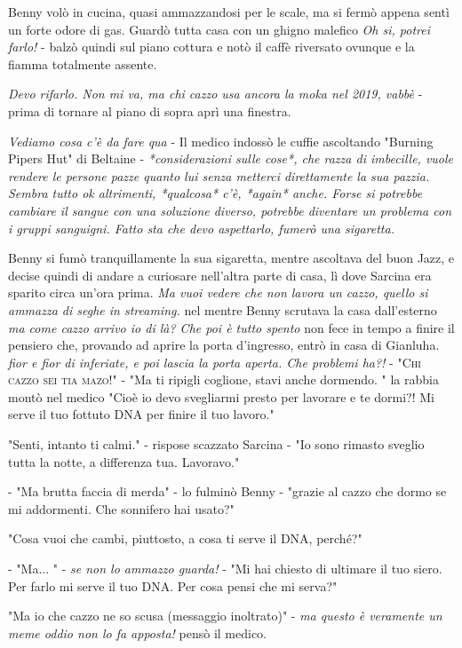 Benny volò in cucina, quasi ammazzandosi per le scale, ma si fermò appena sentì un forte odore di gas. Guardò tutta casa con un ghigno malefico \textit{Oh si, potrei farlo!} - balzò quindi sul piano cottura e notò il caffè riversato ovunque e la fiamma totalmente assente.

\textit{Devo rifarlo. Non mi va, ma chi cazzo usa ancora la moka nel 2019, vabbè} - prima di tornare al piano di sopra aprì una finestra.

\textit{Vediamo cosa c'è da fare qua} - Il medico indossò le cuffie ascoltando "Burning Pipers Hut" di Beltaine - \textit{*considerazioni sulle cose*, che razza di imbecille, vuole rendere le persone pazze quanto lui senza metterci direttamente la sua pazzia. Sembra tutto ok altrimenti, *qualcosa* c'è, *again* anche. Forse si potrebbe cambiare il sangue con una soluzione diverso, potrebbe diventare un problema con i gruppi sanguigni. Fatto sta che devo aspettarlo, fumerò una sigaretta.}

Benny si fumò tranquillamente la sua sigaretta, mentre ascoltava del buon Jazz, e decise quindi di andare a curiosare nell'altra parte di casa, lì dove Sarcina era sparito circa un'ora prima. \textit{Ma vuoi vedere che non lavora un cazzo, quello si ammazza di seghe in streaming.} nel mentre Benny scrutava la casa dall'esterno \textit{ma come cazzo arrivo io di là? Che poi è tutto spento} non fece in tempo a finire il pensiero che, provando ad aprire la porta d'ingresso, entrò in casa di Gianluha. \textit{fior e fior di inferiate, e poi lascia la porta aperta. Che problemi ha?!} - \textsc{"Chi cazzo sei tia mazo!"} - "Ma ti ripigli coglione, stavi anche dormendo. " la rabbia montò nel medico "Cioè io devo svegliarmi presto per lavorare e te dormi?! Mi serve il tuo fottuto DNA per finire il tuo lavoro."

"Senti, intanto ti calmi." - rispose scazzato Sarcina - "Io sono rimasto sveglio tutta la notte, a differenza tua. Lavoravo."

- "Ma brutta faccia di merda" - lo fulminò Benny - "grazie al cazzo che dormo se mi addormenti. Che sonnifero hai usato?"

"Cosa vuoi che cambi, piuttosto, a cosa ti serve il DNA, perché?"

- "Ma... " - \textit{se non lo ammazzo guarda!} - "Mi hai chiesto di ultimare il tuo siero. Per farlo mi serve il tuo DNA. Per cosa pensi che mi serva?"

"Ma io che cazzo ne so scusa (messaggio inoltrato)" - \textit{ma questo è veramente un meme oddio non lo fa apposta!} pensò il medico.



